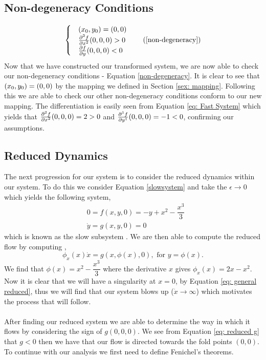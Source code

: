 \subsection{Non-degeneracy Conditions}
\begin{equation}
    \begin{cases}
        &\folds=(0,0)\\
        &\pd[2]{f}{x}(0,0,0)>0\\
        &\pd{f}{y}(0,0,0)<0
    \end{cases} 
    \tag{\ref{non-degeneracy}}
\end{equation}
Now that we have constructed our transformed system, we are now able to check our non-degeneracy conditions - Equation \ref{non-degeneracy}. It is clear to see that $(x_0,y_0)=(0,0)$ by the mapping we defined in Section \ref{sex: mapping}. Following this we are able to check our other non-degeneracy conditions conform to our new mapping. The differentiation is easily seen from Equation \ref{eq: Fast System} which yields that $\pd[2]{f}{x}(0,0,0)=2>0$ and $\pd[1]{f}{y}(0,0,0)=-1<0$, confirming our assumptions.


\subsection{Reduced Dynamics}
The next progression for our system is to consider the reduced dynamics within our system. To do this we consider Equation \ref{slowsystem} and take the $\epsilon\to0$ which yields the following system,
\begin{subequations}
    \begin{align}
    &0=f(x,y,0)=-y+x^2-\dfrac{x^3}{3}\\
        &\dot{y}=g(x,y,0)=0 \label{eq: reduced g}
    \end{align}
\end{subequations}
which is known as the slow subsystem \citep{Kuehn}. We are then able to compute the reduced flow by computing  \citep{krupa2001},
\begin{equation}
    \phi_x(x)\dot{x}=g(x,\phi(x),0),\text{ for }y=\phi(x).
    \label{eq: general reduced}
\end{equation}
We find that $\phi(x)=x^2-\dfrac{x^3}{3}$ where the derivative \wrt $x$ gives $\phi_x(x)=2x-x^2$. Now it is clear that we will have a singularity at $x=0$, by Equation \ref{eq: general reduced}, thus we will find that our system blows up ($\dot{x}\to\infty$) which motivates the process that will follow. \\ \\
After finding our reduced system we are able to determine the way in which it flows by considering the sign of $g(0,0,0)$. We see from Equation \ref{eq: reduced g} that $g<0$ then we have that our flow is directed towards the fold points $(0,0)$. To continue with our analysis we first need to define Fenichel's theorems.

